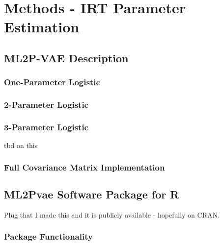\chapter{Methods - IRT Parameter Estimation}

\section{ML2P-VAE Description}

\subsection{One-Parameter Logistic}

\subsection{2-Parameter Logistic}

\subsection{3-Parameter Logistic}
tbd on this

\subsection{Full Covariance Matrix Implementation}

\section{ML2Pvae Software Package for R}
Plug that I made this and it is publicly available - hopefully on CRAN.

\subsection{Package Functionality}

